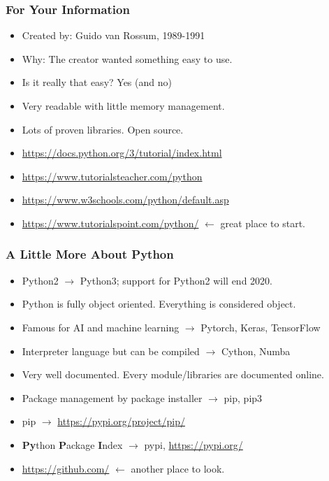
\begin{frame}
\frametitle{For Your Information}

\begin{itemize}
\item Created by: Guido van Rossum, 1989-1991
\item Why: The creator wanted something easy to use.
\item Is it really that easy? Yes (and no)
\item Very readable with little memory management.
\item Lots of proven libraries. Open source.
\item \url{https://docs.python.org/3/tutorial/index.html}
\item \url{https://www.tutorialsteacher.com/python}
\item \url{https://www.w3schools.com/python/default.asp}
\item \url{https://www.tutorialspoint.com/python/} $\longleftarrow$ great place to start.
\end{itemize}

\end{frame}

\begin{frame}
\frametitle{A Little More About Python}

\begin{itemize}
\item Python2 $\longrightarrow$ Python3; support for Python2 will end 2020.
\item Python is fully object oriented. Everything is considered object.
\item Famous for AI and machine learning $\longrightarrow$ Pytorch, Keras, TensorFlow
\item Interpreter language but can be compiled $\longrightarrow$ Cython, Numba
\item Very well documented. Every module/libraries are documented online.
\item Package management by package installer $\longrightarrow$ pip, pip3
\item pip $\longrightarrow$ \url{https://pypi.org/project/pip/}
\item \textbf{Py}thon \textbf{P}ackage \textbf{I}ndex $\longrightarrow$ pypi, \url{https://pypi.org/}
\item \url{https://github.com/} $\longleftarrow$ another place to look.
\end{itemize}

\end{frame}
